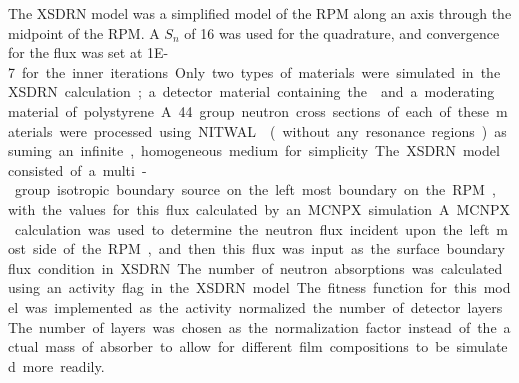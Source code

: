 The XSDRN model was a simplified model of the RPM along an axis through the midpoint of the RPM.
A $S_n$ of 16 was used for the quadrature, and convergence for the flux was set at \SI{1E-7} for the inner iterations.
Only two types of materials were simulated in the XSDRN calculation; a detector material containing the  and a moderating material of polystyrene.
A 44 group neutron cross sections of each of these materials were processed using NITWAL \cite{NITAWL_2011} (without any resonance regions) assuming an infinite, homogeneous medium for simplicity.
The XSDRN model consisted of a multi-group isotropic boundary source on the left most boundary on the RPM, with the values for this flux calculated by an MCNPX simulation.
A MCNPX calculation was used to determine the neutron flux incident upon the left most side of the RPM, and then this flux was input as the surface boundary flux condition in XSDRN.
The number of neutron absorptions was calculated using an activity flag in the XSDRN model.
The fitness function for this model was implemented as the activity normalized the number of detector layers.
The number of layers was chosen as the normalization factor instead of the actual mass of absorber to allow for different film compositions to be simulated more readily.

